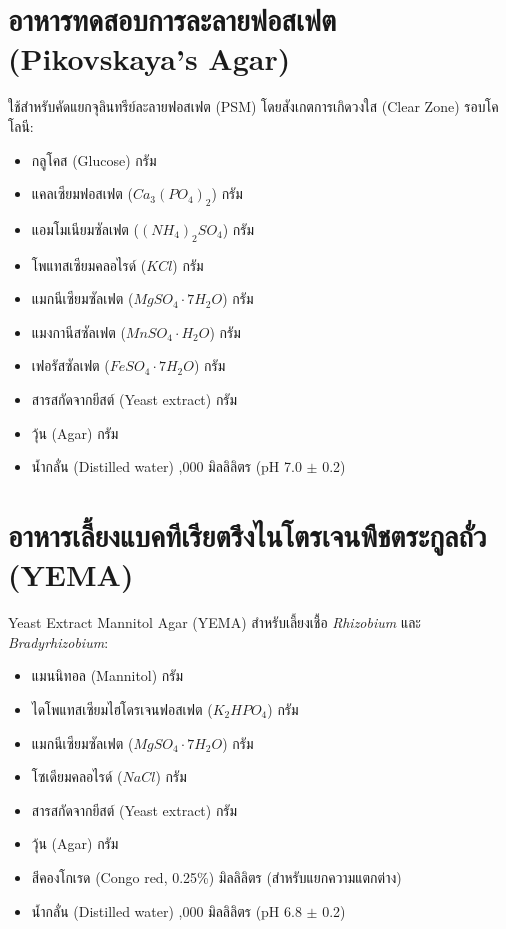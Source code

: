 \section{อาหารทดสอบการละลายฟอสเฟต (Pikovskaya's Agar)}
ใช้สำหรับคัดแยกจุลินทรีย์ละลายฟอสเฟต (PSM) โดยสังเกตการเกิดวงใส (Clear Zone) รอบโคโลนี:
\begin{itemize}
    \item กลูโคส (Glucose)  กรัม
    \item แคลเซียมฟอสเฟต ($Ca_3(PO_4)_2$)  กรัม
    \item แอมโมเนียมซัลเฟต ($(NH_4)_2SO_4$)  กรัม
    \item โพแทสเซียมคลอไรด์ ($KCl$)  กรัม
    \item แมกนีเซียมซัลเฟต ($MgSO_4 \cdot 7H_2O$)  กรัม
    \item แมงกานีสซัลเฟต ($MnSO_4 \cdot H_2O$)  กรัม
    \item เฟอรัสซัลเฟต ($FeSO_4 \cdot 7H_2O$)  กรัม
    \item สารสกัดจากยีสต์ (Yeast extract)  กรัม
    \item วุ้น (Agar)  กรัม
    \item น้ำกลั่น (Distilled water) ,000 มิลลิลิตร (pH 7.0 $\pm$ 0.2)
\end{itemize}

\section{อาหารเลี้ยงแบคทีเรียตรึงไนโตรเจนพืชตระกูลถั่ว (YEMA)}
Yeast Extract Mannitol Agar (YEMA) สำหรับเลี้ยงเชื้อ \textit{Rhizobium} และ \textit{Bradyrhizobium}:
\begin{itemize}
    \item แมนนิทอล (Mannitol)  กรัม
    \item ไดโพแทสเซียมไฮโดรเจนฟอสเฟต ($K_2HPO_4$)  กรัม
    \item แมกนีเซียมซัลเฟต ($MgSO_4 \cdot 7H_2O$)  กรัม
    \item โซเดียมคลอไรด์ ($NaCl$)  กรัม
    \item สารสกัดจากยีสต์ (Yeast extract)  กรัม
    \item วุ้น (Agar)  กรัม
    \item สีคองโกเรด (Congo red, 0.25\%)  มิลลิลิตร (สำหรับแยกความแตกต่าง)
    \item น้ำกลั่น (Distilled water) ,000 มิลลิลิตร (pH 6.8 $\pm$ 0.2)
\end{itemize}

\clearpage